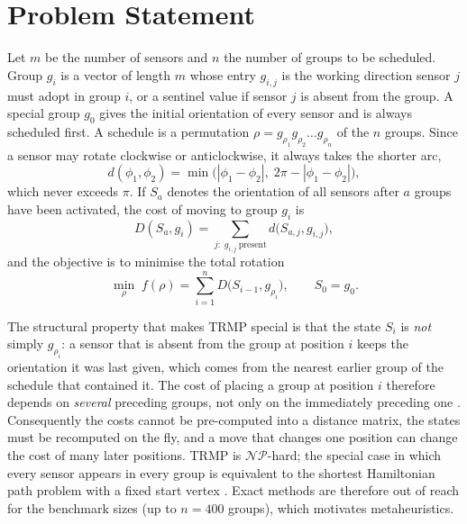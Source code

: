 
\section{Problem Statement}

Let $m$ be the number of sensors and $n$ the number of groups to be scheduled. Group $g_i$ is a vector of length $m$ whose entry $g_{i,j}$ is the working direction sensor $j$ must adopt in group $i$, or a sentinel value if sensor $j$ is absent from the group. A special group $g_0$ gives the initial orientation of every sensor and is always scheduled first. A schedule is a permutation $\rho=g_{\rho_1}g_{\rho_2}\ldots g_{\rho_n}$ of the $n$ groups. Since a sensor may rotate clockwise or anticlockwise, it always takes the shorter arc,
\begin{equation}
d(\phi_1,\phi_2)=\min\bigl(|\phi_1-\phi_2|,\;2\pi-|\phi_1-\phi_2|\bigr),
\end{equation}
which never exceeds $\pi$. If $S_a$ denotes the orientation of all sensors after $a$ groups have been activated, the cost of moving to group $g_i$ is
\begin{equation}
D(S_a,g_i)=\sum_{j:\;g_{i,j}\ \text{present}} d\bigl(S_{a,j},g_{i,j}\bigr),
\label{eq:transition}
\end{equation}
and the objective is to minimise the total rotation
\begin{equation}
\min_{\rho}\; f(\rho)=\sum_{i=1}^{n} D\bigl(S_{i-1},g_{\rho_i}\bigr),\qquad S_0=g_0 .
\label{eq:objective}
\end{equation}

The structural property that makes TRMP special is that the state $S_i$ is \emph{not} simply $g_{\rho_i}$: a sensor that is absent from the group at position $i$ keeps the orientation it was last given, which comes from the nearest earlier group of the schedule that contained it. The cost of placing a group at position $i$ therefore depends on \emph{several} preceding groups, not only on the immediately preceding one \cite{srivastava2018}. Consequently the costs cannot be pre-computed into a distance matrix, the states must be recomputed on the fly, and a move that changes one position can change the cost of many later positions. TRMP is $\mathcal{NP}$-hard; the special case in which every sensor appears in every group is equivalent to the shortest Hamiltonian path problem with a fixed start vertex \cite{srivastava2018}. Exact methods are therefore out of reach for the benchmark sizes (up to $n=400$ groups), which motivates metaheuristics.

